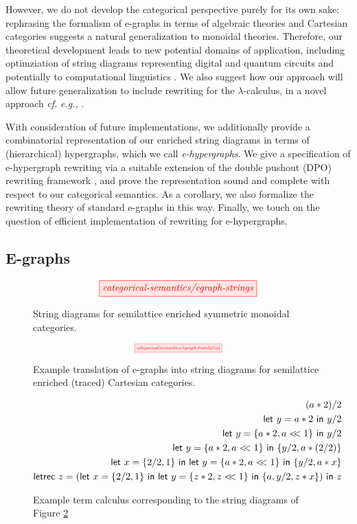 However, we do not develop the categorical perspective purely for its own sake: rephrasing the formalism of e-graphs in terms of algebraic theories and Cartesian categories suggests a natural generalization to monoidal theories. Therefore, our theoretical development leads to new potential domains of application, including optimziation of string diagrams representing digital \cite{ghica_compositional_2023} and quantum circuits
\cite{coecke_interacting_2011,ZX} and potentially to computational linguistics \cite{wazni_quantum_2022,coecke_lambek_2013}.  We also suggest how our approach will allow future  generalization to include rewriting for the $\lambda$-calculus,  in a novel approach \textit{cf.} \textit{e.g.,}
\cite{koehler2022sketchguided}. %

With consideration of future implementations, we 
additionally provide a combinatorial representation of our enriched string diagrams in terms of (hierarchical)  hypergraphs, which we call \textit{e-hypergraphs}.  We give a specification of e-hypergraph rewriting via a suitable extension of the double pushout (DPO) rewriting framework 
\cite{dpo, bonchi_string_2022-1,bonchi_string_2022-2,bonchi_string_2022}, and prove the representation sound and complete with respect to our categorical semantics.  As a corollary, we also formalize the rewriting theory of standard e-graphs in this way.  Finally, we touch on the question of efficient implementation of rewriting for e-hypergraphs. 

\subsection{E-graphs}

\begin{figure}\label{fig:egraph-strings}
\[
    \tikzfig{categorical-semantics/egraph-strings}
\]
\caption{String diagrams for semilattice enriched symmetric monoidal categories.}
\end{figure}

\begin{figure}\label{fig:e-graph-example}
\[
    \scalebox{0.5}{
    \tikzfig{categorical-semantics/egraph-translation}
    }
\]
\caption{Example translation of e-graphs into string diagrams for semilattice enriched (traced) Cartesian categories.}
\end{figure}

\begin{figure}\label{fig:let-calculus}
\begin{align*}
    (a*2)/2 \\
    \mylet{y}{a*2} y/2 \\ 
    \mylet{y}{\{a*2,a<\!\!<1\}} y/2 \\
    \mylet{y}{\{a*2,a<\!\!<1\}} \{y/2, a*(2/2)\} \\
    \mylet{x}{\{2/2, 1\}} \mylet{y}{\{a*2, a <\!\!< 1\}} \{y/2, a*x\} \\
    \textsf{letrec } z = (\mylet{x}{\{2/2, 1\}} \mylet{y}{\{z*2, z <\!\!< 1\}} \{a, y/2, z*x\}) \textsf{ in } z
\end{align*}
\caption{Example term calculus corresponding to the string diagrams of Figure \ref{fig:e-graph-example}}
\end{figure}

